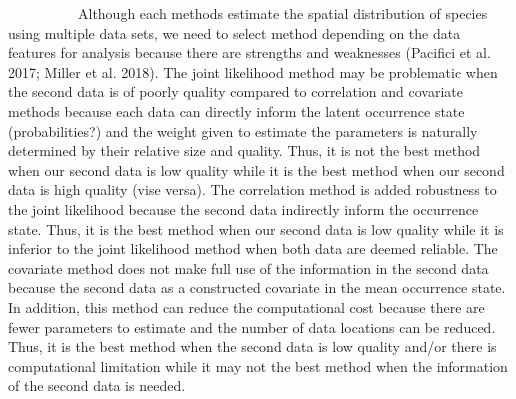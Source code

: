 \documentclass[12pt]{article}
\begin{document}
\begin{linenumbers}
\ \ \ \ \ \ \ \ \ \ 
Although each methods estimate the spatial distribution of species using multiple data sets, we need to select method depending on the data features for analysis because there are strengths and weaknesses (Pacifici et al. 2017; Miller et al. 2018). The joint likelihood method may be problematic when the second data is of poorly quality compared to correlation and covariate methods because each data can directly inform the latent occurrence state (probabilities?) and the weight given to estimate the parameters is naturally determined by their relative size and quality. Thus, it is not the best method when our second data is low quality while it is the best method when our second data is high quality (vise versa). 
The correlation method is added robustness to the joint likelihood because the second data indirectly inform the occurrence state. Thus, it is the best method when our second data is low quality while it is inferior to the joint likelihood method when both data are deemed reliable.
The covariate method does not make full use of the information in the second data because the second data as a constructed covariate in the mean occurrence state. In addition, this method can reduce the computational cost because there are fewer parameters to estimate and the number of data locations can be reduced. Thus, it is the best method when the second data is low quality and/or there is computational limitation while it may not the best method when the information of the second data is needed.




\end{linenumbers}
\end{document}
